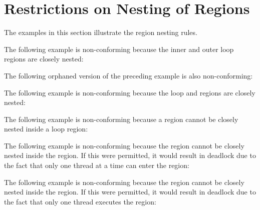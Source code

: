 \section{Restrictions on Nesting of Regions}
\label{sec:nesting_restrict}

The examples in this section illustrate the region nesting rules. 

The following example is non-conforming because the inner and outer loop regions 
are closely nested:


\clearpage

The following orphaned version of the preceding example is also non-conforming:



The following example is non-conforming because the loop and  regions 
are closely nested:



The following example is non-conforming because a  region cannot 
be closely nested inside a loop region:



The following example is non-conforming because the  region cannot 
be closely nested inside the  region. If this were permitted, 
it would result in deadlock due to the fact that only one thread at a time can 
enter the  region:



The following example is non-conforming because the  region cannot 
be closely nested inside the  region. If this were permitted, it 
would result in deadlock due to the fact that only one thread executes the  
region:




